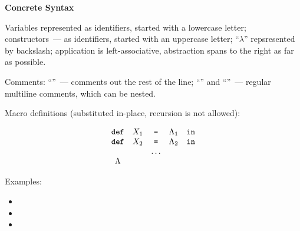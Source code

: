 \documentclass{article}
\begin{document}

\vskip 1cm
\textbf{Concrete Syntax}
\vskip 7mm

\justify

Variables represented as identifiers, started with a lowercase letter; 
constructors~--- as identifiers, started with an uppercase letter; ``$\lambda$'' 
repsresented by backslash; application is left-associative, abstraction spans 
to the right as far as possible.

Comments: ``\cd{--}''~--- comments out the rest of the line; ``\cd{(*}'' and 
``\cd{*)}''~--- regular multiline comments, which can be nested.

Macro definitions (substituted in-place, recursion is not allowed):

$$
\begin{array}{ccccc}
\mbox{\texttt{def}}&X_1& \mbox{\texttt{=}} &\Lambda_1&\mbox{\texttt{in}}\\
\mbox{\texttt{def}}&X_2& \mbox{\texttt{=}} &\Lambda_2&\mbox{\texttt{in}} \\
        &   &\ldots & & \\
\Lambda & & & &
\end{array}
$$

Examples:

\begin{itemize}
\item {}
\item {}
\item {}
\end{itemize}
\end{document}
